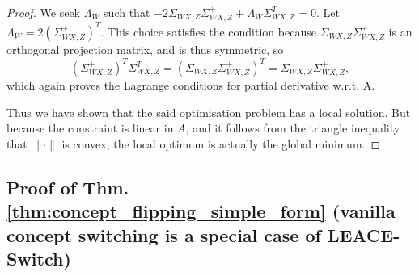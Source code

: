 \begin{proof}
We seek $\Lambda_W$ such that $-2 \Sigma_{WX, Z} \Sigma_{WX, Z}^+ + \Lambda_W \Sigma_{WX, Z}^T = 0$.
Let $\Lambda_W = 2 (\Sigma_{WX, Z}^+)^T$. This choice satisfies the condition because $\Sigma_{WX, Z} \Sigma_{WX, Z}^+$ is an orthogonal projection matrix, and is thus symmetric, so
\begin{equation*}
    (\Sigma_{WX, Z}^+)^T \Sigma_{WX, Z}^T = (\Sigma_{WX, Z} \Sigma_{WX, Z}^+)^T = \Sigma_{WX, Z} \Sigma_{WX, Z}^+ ,
\end{equation*}
which again proves the Lagrange conditions for partial derivative w.r.t. A.

Thus we have shown that the said optimisation problem has a local solution. But because the constraint is linear in $A$, and it follows from the triangle inequality that $\lVert{\cdot}\rVert$ is convex, the local optimum is actually the global minimum.

\end{proof}


\subsection{Proof of Thm. \ref{thm:concept_flipping_simple_form} (vanilla concept switching is a special case of LEACE-Switch)}

\label{proof:vanilla_switching_is_special_case_of_LEACE_switch}


